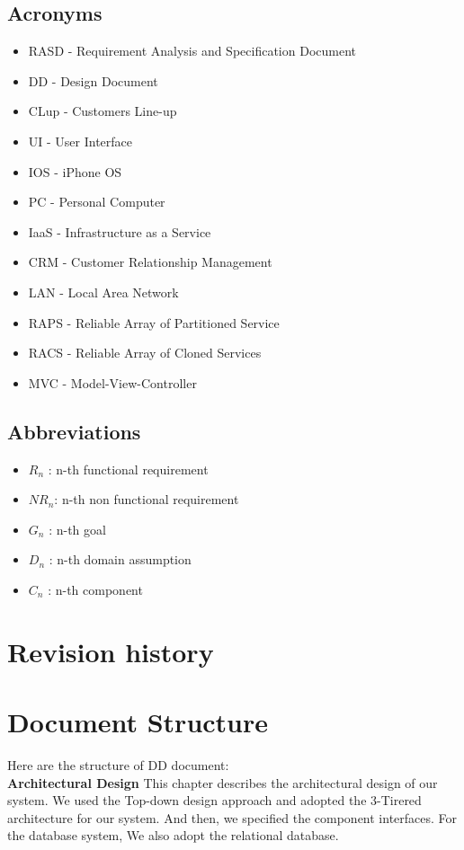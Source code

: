 \documentclass[a4paper,12pt]{report}
\begin{document}
\subsection{Acronyms}
\begin{itemize}
	\item RASD - Requirement Analysis and Specification Document
	\item DD - Design Document
	\item CLup - Customers Line-up
	\item UI - User Interface
	\item IOS - iPhone OS
	\item PC - Personal Computer
	\item IaaS - Infrastructure as a Service %
	\item CRM - Customer Relationship Management
	\item LAN - Local Area Network
	\item RAPS - Reliable Array of Partitioned Service
	\item RACS - Reliable Array of Cloned Services
	\item MVC - Model-View-Controller
\end{itemize}


\subsection{Abbreviations}
\begin{itemize}
	\item  $R_n$ : n-th functional requirement
	\item  $NR_n$: n-th non functional requirement
	\item  $G_n$ : n-th goal
	\item  $D_n$ : n-th domain assumption
	\item  $C_n$ : n-th component
\end{itemize}


\section{Revision history}


\section{Document Structure}
Here are the structure of DD document:~\\

\textbf{Architectural Design}
This chapter describes the architectural design of our system.
We used the Top-down design approach and adopted the 3-Tirered architecture for our system.
And then, we specified the component interfaces. For the database system, We also adopt the relational database.~\\
\end{document}
